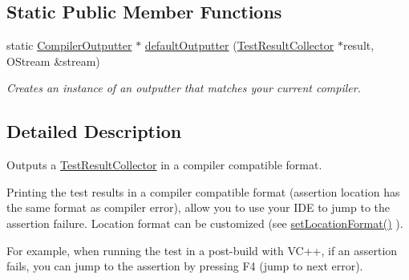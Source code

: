 \subsection*{Static Public Member Functions}
\begin{DoxyCompactItemize}
\item 
static \hyperlink{class_compiler_outputter}{Compiler\+Outputter} $\ast$ \hyperlink{class_compiler_outputter_aa0f8f9b1fb25fe8873b7454f91dcc929}{default\+Outputter} (\hyperlink{class_test_result_collector}{Test\+Result\+Collector} $\ast$result, O\+Stream \&stream)
\begin{DoxyCompactList}\small\item\em Creates an instance of an outputter that matches your current compiler. \end{DoxyCompactList}\end{DoxyCompactItemize}


\subsection{Detailed Description}
Outputs a \hyperlink{class_test_result_collector}{Test\+Result\+Collector} in a compiler compatible format.

Printing the test results in a compiler compatible format (assertion location has the same format as compiler error), allow you to use your I\+DE to jump to the assertion failure. Location format can be customized (see \hyperlink{class_compiler_outputter_a0d9e67c7bdcb443b0b2754d61a10790c}{set\+Location\+Format()} ). 

For example, when running the test in a post-\/build with V\+C++, if an assertion fails, you can jump to the assertion by pressing F4 (jump to next error).


